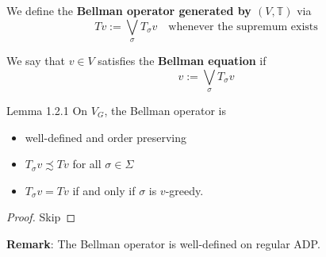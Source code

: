 \begin{frame}
\begin{definition}
    We define the \textbf{Bellman operator generated by $(V,\mathbb{T})$} via
    $$
    Tv:= \bigvee_\sigma T_\sigma v\quad \text{whenever the supremum exists}
    $$
\end{definition}
\begin{definition}
    We say that $v\in V$ satisfies the \textbf{Bellman equation} if
    $$
    v:= \bigvee_\sigma T_\sigma v
    $$
\end{definition}
    
\end{frame}
\begin{frame}{Lemma 1.2.1}
On $V_G$, the Bellman operator is 
\begin{itemize}
    \item well-defined and order preserving
    \item $T_\sigma v\precsim Tv$ for all $\sigma\in\Sigma$
    \item $T_\sigma v= Tv$ if and only if $\sigma$ is $v$-greedy.
\end{itemize}
\begin{proof}
    Skip
\end{proof}
\textbf{Remark}: The Bellman operator is well-defined on regular ADP. 
\end{frame}